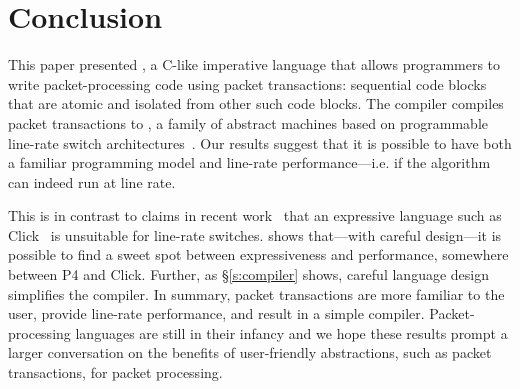 \section{Conclusion}
\label{s:conclusion}

This paper presented \pktlanguage, a C-like imperative language that allows
programmers to write packet-processing code using packet transactions:
sequential code blocks that are atomic and isolated from other such code
blocks. The \pktlanguage compiler compiles packet transactions to \absmachine,
a family of abstract machines based on programmable line-rate switch
architectures~\cite{flexpipe, xpliant, rmt}. Our results suggest that it is
possible to have both a familiar programming model and line-rate
performance---i.e. if the algorithm can indeed run at line rate.

This is in contrast to claims in recent work~\cite{p4} that an expressive
language such as Click~\cite{click} is unsuitable for line-rate switches.
\pktlanguage shows that---with careful design---it is possible to find a sweet
spot between expressiveness and performance, somewhere between P4 and Click.
Further, as \S\ref{s:compiler} shows, careful language design simplifies the
compiler.  In summary, packet transactions are more familiar to the user,
provide line-rate performance, and result in a simple compiler.
Packet-processing languages are still in their infancy and we hope these
results prompt a larger conversation on the benefits of user-friendly
abstractions, such as packet transactions, for packet processing.
